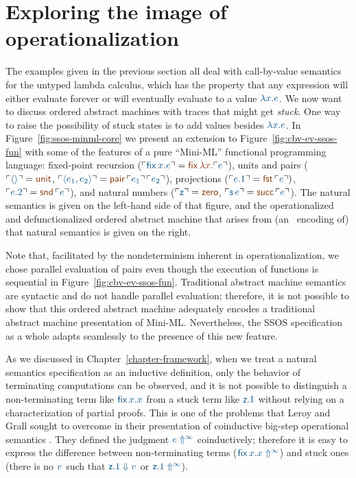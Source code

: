 \section{Exploring the image of operationalization}
\label{sec:absmachine-nondeterminism}

The examples given in the previous section all deal
with call-by-value semantics for the untyped lambda calculus, which
has the property that any expression will either evaluate forever or
will eventually evaluate to a value $\obj{\lambda x. e}$. We now want to
discuss ordered abstract machines with traces
that might get {\it stuck}. One way to raise the possibility of stuck
states is to add values besides $\obj{\lambda x.e}$. In
Figure~\ref{fig:ssos-minml-core} we present an extension to
Figure~\ref{fig:cbv-ev-ssos-fun} with some of the features of a pure
``Mini-ML'' functional programming language: fixed-point recursion
($\interp{{\sf fix}\,x.e} = \lf{{\sf fix}\,\lambda x.\interp{e}}$),
units and pairs ($\interp{\langle\rangle} = \lf{\sf unit}$,
$\interp{\langle e_1, e_2 \rangle} = \lf{{\sf
  pair}\,\interp{e_1}\,\interp{e_2}}$), projections ($\interp{e.1} =
\lf{{\sf fst}\,\interp{e}})$, $\interp{e.2} = \lf{{\sf snd}\,\interp{e}}$), and
natural numbers ($\interp{{\sf z}} = \lf{{\sf zero}}$, $\interp{{\sf s}\,e}
= \lf{{\sf succ}\,\interp{e}}$).  The natural semantics is given on the
left-hand side of that figure, and the operationalized and
defunctionalized ordered abstract machine that arises from (an
\sls~encoding of) that natural semantics is given on the right.


Note that, facilitated by the nondeterminism inherent in
operationalization, we chose parallel evaluation of pairs even though
the execution of functions is sequential in
Figure~\ref{fig:cbv-ev-ssos-fun}.  Traditional abstract machine
semantics are syntactic and do not handle parallel evaluation;
therefore, it is not possible to show that this ordered abstract
machine adequately encodes a traditional abstract machine presentation
of Mini-ML. Nevertheless, the SSOS specification as a whole adapts
seamlessly to the presence of this new feature.

As we discussed in Chapter~\ref{chapter-framework}, 
when we treat a natural semantics
specification as an inductive definition, only the behavior of
terminating computations can be observed, and it is not possible to
distinguish a non-terminating term like $\obj{{\sf fix}\,x.x}$ from a
stuck term like $\obj{{\sf z}.1}$ without relying on a
characterization of partial proofs.  This is one of the problems that
Leroy and Grall sought to overcome in their presentation of
coinductive big-step operational semantics
\cite{leroy09coinductive}. They defined the judgment $\obj{e
  \Uparrow^\infty}$ coinductively; therefore it is easy to express the
difference between non-terminating terms ($\obj{{\sf fix}\,x.x
  \Uparrow^\infty}$) and stuck ones (there is no $\obj{v}$ such that
$\obj{{\sf z}.1 \Downarrow v}$ or $\obj{{\sf z}.1 \Uparrow^\infty}$).

